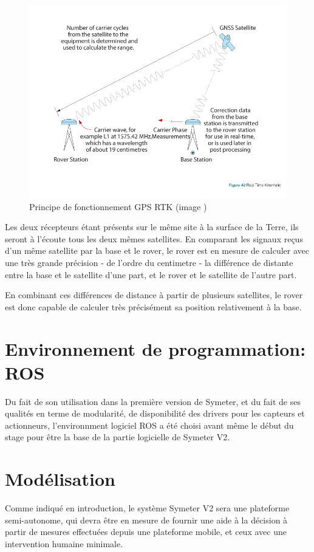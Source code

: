 \documentclass[12pt,a4paper]{report}
\begin{document}
		\begin{figure}[h!]
			\centering
			\includegraphics[width=0.7\linewidth]{img/rtk}
			\caption[gpsrtk]{Principe de fonctionnement GPS RTK (image \cite{jeffrey_introduction_2010}) }
			\label{fig:rtk}
		\end{figure}
	
		\para Les deux récepteurs étant présents sur le même site à la surface de la Terre, ils seront à l'écoute tous les deux mêmes satellites. En comparant les signaux reçus d'un même satellite par la base et le rover, le rover est en mesure de calculer avec une très grande précision - de l'ordre du centimetre - la différence de distante entre la base et le satellite d'une part, et le rover et le satellite de l'autre part. 
		

		\para En combinant ces différences de distance à partir de plusieurs satellites, le rover est donc capable de calculer très précisément sa position relativement à la base.
		\newpage
		
		
	\section{Environnement de programmation: ROS}
	Du fait de son utilisation dans la première version de Symeter, et du fait de ses qualités en terme de modularité, de disponibilité des drivers pour les capteurs et actionneurs, l'environnment logiciel ROS a été choisi avant même le début du stage pour être la base de la partie logicielle de Symeter V2.

	
	
		
	\section{Modélisation}
	
	\para Comme indiqué en introduction, le système Symeter V2 sera une plateforme semi-autonome, qui devra être en mesure de fournir une aide à la décision à partir de mesures effectuées depuis une plateforme mobile, et ceux avec une intervention humaine minimale.
	
\end{document}

